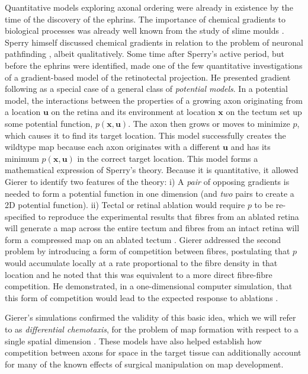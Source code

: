 \documentclass[11pt, a4paper]{article}
\begin{document}
Quantitative models exploring axonal ordering were already in existence by the time of the discovery of the ephrins.
The importance of chemical gradients to biological processes was already well known from the study of slime moulds \citep{bonner_evidence_1947}.
Sperry himself discussed chemical gradients in relation to the problem of neuronal pathfinding \citep{sperry_problems_1955}, albeit qualitatively.
Some time after Sperry's active period, but before the ephrins were identified, \citet{gierer_development_1981,gierer_model_1983,gierer_directional_1987} made one of the few quantitative investigations of a gradient-based model of the retinotectal projection. He presented gradient following as a special case of a general class of \emph{potential models}.
In a potential model, the interactions between the properties of a growing axon originating from a location $\mathbf{u}$ on the retina and its environment at location $\mathbf{x}$ on the tectum set up some potential function, $p(\mathbf{x},\mathbf{u})$.
The axon then grows or moves to minimize $p$, which causes it to find its target location. This model successfully creates the wildtype map because each axon originates with a different $\mathbf{u}$ and has its minimum $p(\mathbf{x},\mathbf{u})$ in the correct target location.
This model forms a mathematical expression of Sperry's theory. Because it is quantitative, it allowed Gierer to identify two features of the theory: i) A \emph{pair} of opposing gradients is needed to form a potential function in one dimension (and \emph{two} pairs to create a 2D potential function). ii) Tectal or retinal ablation would require $p$ to be re-specified to reproduce the experimental results that fibres from an ablated retina will generate a map across the entire tectum and fibres from an intact retina will form a compressed map on an ablated tectum \citep{attardi_preferential_1963,schmidt_retinal_1978,schmidt_expansion_1978}.
Gierer addressed the second problem by introducing a form of competition between fibres, postulating that $p$ would accumulate locally at a rate proportional to the fibre density in that location and he noted that this was equivalent to a more direct fibre-fibre competition.
He demonstrated, in a one-dimensional computer simulation, that this form of competition would lead to the expected response to ablations \citep{gierer_model_1983}.

Gierer's simulations confirmed the validity of this basic idea, which we will refer to as \emph{differential chemotaxis}, for the problem of map formation with respect to a single spatial dimension \citep{gierer_model_1983,karbowski_model_2004}.
These models have also helped establish how competition between axons for space in the target tissue can additionally account for many of the known effects of surgical manipulation on map development.
\end{document}
